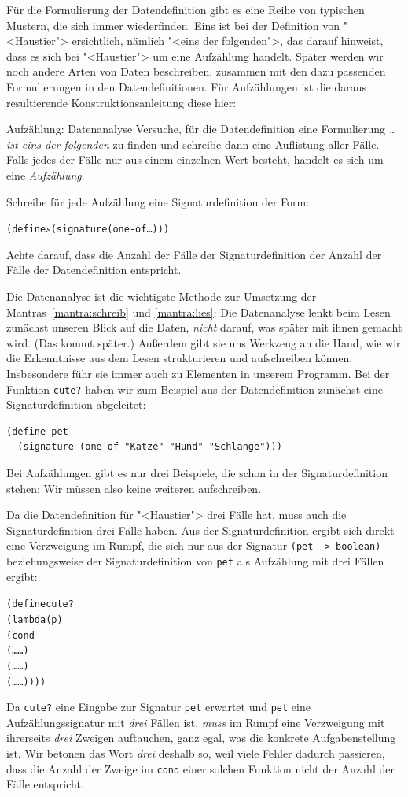 Für die Formulierung der Datendefinition gibt es eine Reihe von
typischen Mustern, die sich immer wiederfinden.  Eins ist bei der
Definition von "<Haustier"> ersichtlich, nämlich "<eins der
folgenden">, das darauf hinweist, dass es sich bei "<Haustier"> um
eine Aufzählung handelt.  Später werden wir noch andere Arten
von Daten beschreiben, zusammen mit den dazu passenden Formulierungen
in den Datendefinitionen.  Für Aufzählungen
ist die daraus resultierende Konstruktionsanleitung diese hier:
%
\begin{konstruktionsanleitung}{Aufzählung: Datenanalyse}
  \label{ka:aufzaehlung}
  Versuche, für die Datendefinition eine Formulierung \emph{\ldots{}
    ist eins der folgenden} zu finden und schreibe dann eine
  Auflistung aller Fälle.  Falls jedes der Fälle nur aus einem
  einzelnen Wert besteht, handelt es sich um eine
  \textit{Aufzählung}.

  Schreibe für jede Aufzählung eine Signaturdefinition der Form:
\begin{alltt}
(define \(s\) (signature (one-of \ldots)))
\end{alltt}
  Achte darauf, dass die Anzahl der Fälle der Signaturdefinition der
  Anzahl der Fälle der Datendefinition entspricht.
\end{konstruktionsanleitung}
%
Die Datenanalyse ist die wichtigste Methode zur Umsetzung der
Mantras~\ref{mantra:schreib} und \ref{mantra:lies}:
%
\mantraschreib*
%
\mantralies*
%
\noindent Die Datenanalyse lenkt beim Lesen zunächst unseren Blick auf die
Daten, \emph{nicht} darauf, was später mit ihnen gemacht wird.  (Das
kommt später.)  Außerdem gibt sie uns Werkzeug an die Hand, wie wir
die Erkenntnisse aus dem Lesen strukturieren und aufschreiben können.
Insbesondere führ sie immer auch zu Elementen in unserem Programm.
Bei der Funktion \texttt{cute?} haben wir zum Beispiel aus der
Datendefinition zunächst eine Signaturdefinition abgeleitet:
%
\begin{verbatim}
(define pet
  (signature (one-of "Katze" "Hund" "Schlange")))
\end{verbatim}
%
Bei Aufzählungen gibt es nur drei Beispiele, die schon in der
Signaturdefinition stehen: Wir müssen also keine weiteren
aufschreiben.

Da die Datendefinition für "<Haustier"> drei Fälle hat, muss auch die
Signaturdefinition drei Fälle haben.  Aus der Signaturdefinition
ergibt sich direkt eine Verzweigung im Rumpf, die sich nur aus der
Signatur \texttt{(pet -> boolean)} beziehungsweise der
Signaturdefinition von \texttt{pet} als Aufzählung mit drei Fällen
ergibt:
%
\begin{alltt}
(define cute?
  (lambda (p)
    (cond
      (\ldots{} \ldots)
      (\ldots{} \ldots)
      (\ldots{} \ldots))))
\end{alltt}
%
Da \texttt{cute?} eine Eingabe zur Signatur \texttt{pet} erwartet und
\texttt{pet} eine Aufzählungssignatur mit \emph{drei} Fällen ist, \emph{muss}
im Rumpf eine Verzweigung mit ihrerseits \emph{drei} Zweigen
auftauchen, ganz egal, was die konkrete Aufgabenstellung ist.  Wir
betonen das Wort \emph{drei} deshalb so, weil viele Fehler dadurch
passieren, dass die Anzahl der Zweige im \texttt{cond} einer solchen
Funktion nicht der Anzahl der Fälle entspricht.

